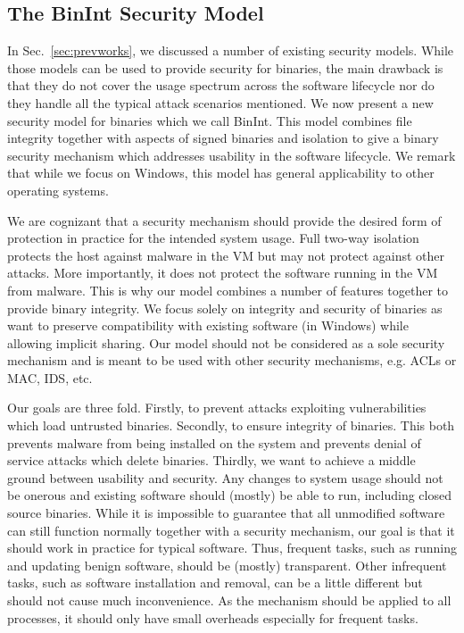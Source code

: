 \subsection{The BinInt Security Model}
\label{sec:binint}

In Sec.~\ref{sec:prevworks}, we discussed a number of existing
security models. While those models can be used to provide security
for binaries, the main drawback is that they do not cover the usage spectrum
across the software lifecycle nor do they handle all the
typical attack scenarios mentioned.
We now present a new security model for binaries
which we call BinInt.
This model combines file integrity together with
aspects of signed binaries and isolation to give a binary
security mechanism which 
addresses usability in the software lifecycle. We remark
that while we focus on Windows, this model has general applicability
to other operating systems.

We are cognizant that a security mechanism
should provide the desired form of protection in practice for
the intended system usage.
Full two-way isolation protects the host
against malware in the VM but may not
protect against other attacks.
More importantly, it does not protect the software running 
in the VM from malware.
This is why our model combines a number of features together to provide
binary integrity. 
We focus solely on integrity and security of binaries
as want to preserve compatibility with existing
software (in Windows) while allowing implicit sharing.
Our model should not be considered as a sole security mechanism and
is meant to be used with other security mechanisms, 
e.g. ACLs or MAC, IDS, etc.

Our goals are three fold.
Firstly, to prevent attacks exploiting vulnerabilities which load 
untrusted binaries.
Secondly, to ensure integrity of binaries.
This both prevents malware from being installed on the system and 
prevents denial of service attacks which delete binaries.
Thirdly, we want to achieve a middle ground
between usability and security.
Any changes to system usage should not be onerous and existing software 
should (mostly) be able to run, including closed source binaries.
While it is impossible to guarantee that all unmodified software can still
function normally together with a security mechanism, our goal is that
it should work in practice for typical software.
Thus, frequent tasks, such as running and updating benign software, 
should be (mostly) transparent.
Other infrequent tasks, such as software installation and removal, 
can be a little different but should not cause much inconvenience.
As the mechanism should be applied to all processes, 
it should only have small overheads especially for frequent tasks.

